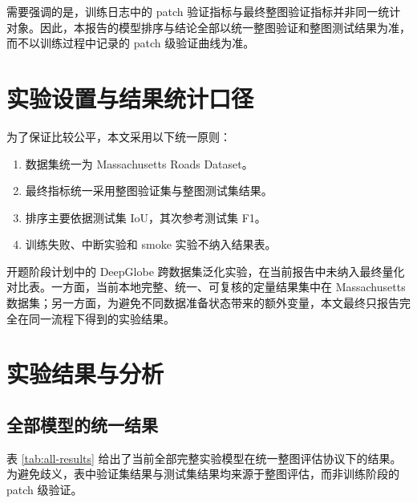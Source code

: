 \documentclass[12pt,a4paper]{ctexart}
\begin{document}
需要强调的是，训练日志中的 patch 验证指标与最终整图验证指标并非同一统计对象。因此，本报告的模型排序与结论全部以统一整图验证和整图测试结果为准，而不以训练过程中记录的 patch 级验证曲线为准。

\section{实验设置与结果统计口径}
为了保证比较公平，本文采用以下统一原则：
\begin{enumerate}
    \item 数据集统一为 Massachusetts Roads Dataset。
    \item 最终指标统一采用整图验证集与整图测试集结果。
    \item 排序主要依据测试集 IoU，其次参考测试集 F1。
    \item 训练失败、中断实验和 smoke 实验不纳入结果表。
\end{enumerate}

开题阶段计划中的 DeepGlobe 跨数据集泛化实验，在当前报告中未纳入最终量化对比表。一方面，当前本地完整、统一、可复核的定量结果集中在 Massachusetts 数据集；另一方面，为避免不同数据准备状态带来的额外变量，本文最终只报告完全在同一流程下得到的实验结果。

\section{实验结果与分析}
\subsection{全部模型的统一结果}
表 \ref{tab:all-results} 给出了当前全部完整实验模型在统一整图评估协议下的结果。为避免歧义，表中验证集结果与测试集结果均来源于整图评估，而非训练阶段的 patch 级验证。
\end{document}
